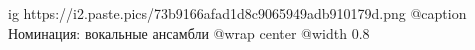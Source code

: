  
 
 
 
 

\ifcmt
  ig https://i2.paste.pics/73b9166afad1d8c9065949adb910179d.png
	@caption Номинация: вокальные ансамбли
	@wrap center
	@width 0.8
\fi



